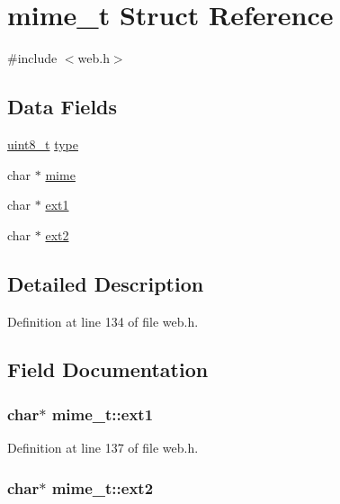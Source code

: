 \hypertarget{structmime__t}{}\section{mime\+\_\+t Struct Reference}
\label{structmime__t}


{\ttfamily \#include $<$web.\+h$>$}

\subsection*{Data Fields}
\begin{DoxyCompactItemize}
\item 
\hyperlink{send_8c_aba7bc1797add20fe3efdf37ced1182c5}{uint8\+\_\+t} \hyperlink{structmime__t_ae69826dcfd475d65fa0fe8a1574bb3af}{type}
\item 
char $\ast$ \hyperlink{structmime__t_ad796d16eaee60d7435bff66b2e9b8a8d}{mime}
\item 
char $\ast$ \hyperlink{structmime__t_a22af12abb536a48d3425a3a4d1cce2a4}{ext1}
\item 
char $\ast$ \hyperlink{structmime__t_ae16e9342ecd4df97a2564658f1f506b1}{ext2}
\end{DoxyCompactItemize}


\subsection{Detailed Description}


Definition at line 134 of file web.\+h.



\subsection{Field Documentation}
\subsubsection[{\texorpdfstring{ext1}{ext1}}]{\setlength{\rightskip}{0pt plus 5cm}char$\ast$ mime\+\_\+t\+::ext1}\hypertarget{structmime__t_a22af12abb536a48d3425a3a4d1cce2a4}{}\label{structmime__t_a22af12abb536a48d3425a3a4d1cce2a4}


Definition at line 137 of file web.\+h.

\subsubsection[{\texorpdfstring{ext2}{ext2}}]{\setlength{\rightskip}{0pt plus 5cm}char$\ast$ mime\+\_\+t\+::ext2}\hypertarget{structmime__t_ae16e9342ecd4df97a2564658f1f506b1}{}\label{structmime__t_ae16e9342ecd4df97a2564658f1f506b1}


